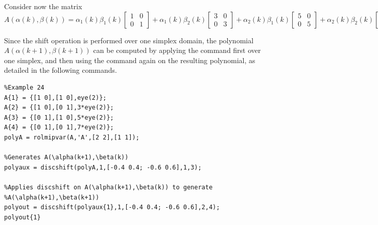 \documentclass[english,11pt]{article}
\theoremstyle{break} \theorembodyfont{\small\rm}
\begin{document}
Consider now the matrix
\[
 A(\alpha(k),\beta(k)) = \alpha_1(k)\beta_1(k) \begin{bmatrix} 1 & 0 \\ 0 & 1 \end{bmatrix}
 + \alpha_1(k)\beta_2(k) \begin{bmatrix} 3 & 0 \\ 0 & 3 \end{bmatrix}
 + \alpha_2(k)\beta_1(k) \begin{bmatrix} 5 & 0 \\ 0 & 5 \end{bmatrix}
 + \alpha_2(k)\beta_2(k) \begin{bmatrix} 7 & 0 \\ 0 & 7 \end{bmatrix}.
\]

Since the shift operation is performed over one simplex domain, the polynomial $A(\alpha(k+1),\beta(k+1))$
can be computed by applying the  command first over one simplex, and then using the
command again on the resulting polynomial, as detailed in the following commands.

\begin{minipage}{14.5cm}
 \begin{lstlisting}
%Example 24
A{1} = {[1 0],[1 0],eye(2)};
A{2} = {[1 0],[0 1],3*eye(2)};
A{3} = {[0 1],[1 0],5*eye(2)};
A{4} = {[0 1],[0 1],7*eye(2)};
polyA = rolmipvar(A,'A',[2 2],[1 1]);

%Generates A(\alpha(k+1),\beta(k))
polyaux = discshift(polyA,1,[-0.4 0.4; -0.6 0.6],1,3);

%Applies discshift on A(\alpha(k+1),\beta(k)) to generate
%A(\alpha(k+1),\beta(k+1))
polyout = discshift(polyaux{1},1,[-0.4 0.4; -0.6 0.6],2,4);
polyout{1}
 \end{lstlisting}
\end{minipage}
\vspace{0.2cm}
\end{document}
